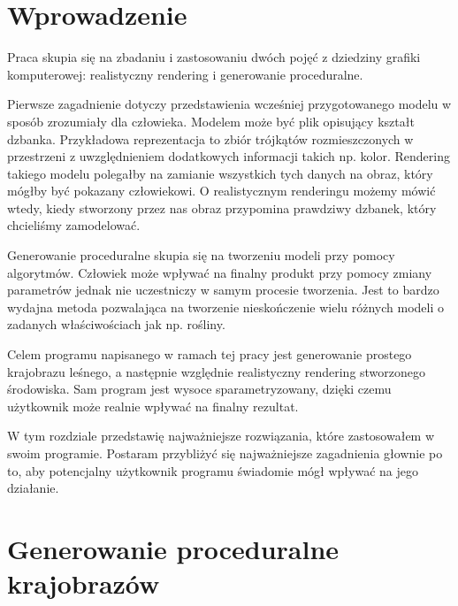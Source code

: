 \documentclass[inz,longabstract]{iithesis}
\author         {Bartosz Rudzki}
\begin{document}
\chapter{Wprowadzenie}
    Praca skupia się na zbadaniu i zastosowaniu dwóch pojęć z dziedziny grafiki komputerowej: realistyczny rendering i generowanie proceduralne. 
    
    Pierwsze zagadnienie dotyczy przedstawienia wcześniej przygotowanego modelu w sposób zrozumiały dla człowieka. Modelem może być plik opisujący kształt dzbanka. Przykładowa reprezentacja to zbiór trójkątów rozmieszczonych w przestrzeni z uwzględnieniem dodatkowych informacji takich np. kolor. Rendering takiego modelu polegałby na zamianie wszystkich tych danych na obraz, który mógłby być pokazany człowiekowi. O realistycznym renderingu możemy mówić wtedy, kiedy stworzony przez nas obraz przypomina prawdziwy dzbanek, który chcieliśmy zamodelować. 
    
    Generowanie proceduralne skupia się na tworzeniu modeli przy pomocy algorytmów. Człowiek może wpływać na finalny produkt przy pomocy zmiany parametrów jednak nie uczestniczy w samym procesie tworzenia. Jest to bardzo wydajna metoda pozwalająca na tworzenie nieskończenie wielu różnych modeli o zadanych właściwościach jak np. rośliny.
    
    Celem programu napisanego w ramach tej pracy jest generowanie prostego krajobrazu leśnego, a następnie względnie realistyczny rendering stworzonego środowiska. Sam program jest wysoce sparametryzowany, dzięki czemu użytkownik może realnie wpływać na finalny rezultat.
    
    W tym rozdziale przedstawię najważniejsze rozwiązania, które zastosowałem w swoim programie. Postaram przybliżyć się najważniejsze zagadnienia głownie po to, aby potencjalny użytkownik programu świadomie mógł wpływać na jego działanie. 
    
\chapter{Generowanie proceduralne krajobrazów}
\end{document}
